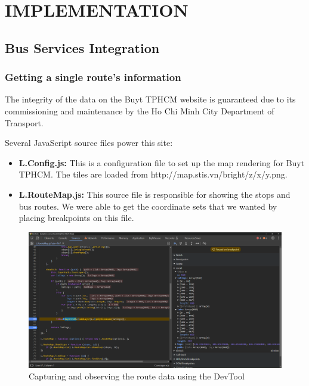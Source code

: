 %
%
\section{IMPLEMENTATION}
\label{section:implementation}

\subsection{Bus Services Integration}

\subsubsection{Getting a single route's information}

The integrity of the data on the Buyt TPHCM website is guaranteed due to its commissioning and maintenance by the Ho Chi Minh City Department of Transport. 

Several JavaScript source files power this site:
\begin{itemize}
    \item \textbf{L.Config.js:} This is a configuration file to set up the map rendering for Buyt TPHCM. The tiles are loaded from http://map.stis.vn/bright/{z}/{x}/{y}.png.
    \item \textbf{L.RouteMap.js:} This source file is responsible for showing the stops and bus routes. We were able to get the coordinate sets that we wanted by placing breakpoints on this file.
\end{itemize}

\begin{figure}[H]
    \includegraphics[width=\textwidth]{assets/images/Research/Bus/lat_long_web.png}
    \caption{Capturing and observing the route data using the DevTool}
    \label{fig:lat_long_web}
\end{figure}

